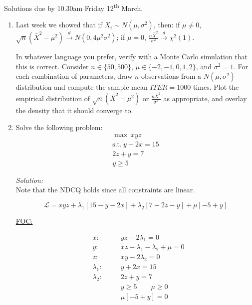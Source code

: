 \documentclass[12pt]{article}
\newif\ifsln
\begin{document}
\pagestyle{fancyplain}


\chead{\textbf{Tutorial 5 \ifsln Solutions \fi}}

\begin{center}
Solutions due by 10.30am Friday 12\textsuperscript{th} March.
\end{center}

\begin{enumerate}[1.]
\setlength\itemsep{5mm}

\item Last week we showed that if $X_{i} \sim N(\mu, \sigma^{2})$, then: if $\mu \not = 0$, $\sqrt{n}(\bar{X}^{2} - \mu^{2}) \overset{d}{\to} N(0, 4\mu^{2}\sigma^{2})$; if $\mu = 0$, $\frac{n\bar{X}^{2}}{\sigma^{2}} \overset{d}{\to} \chi^{2}(1)$. \smallskip

In whatever language you prefer, verify with a Monte Carlo simulation that this is correct. Consider $n \in \{50, 500\}$, $\mu \in \{-2, -1, 0, 1, 2\}$, and $\sigma^{2} = 1$. For each combination of parameters, draw $n$ observations from a $N(\mu, \sigma^{2})$ distribution and compute the sample mean $ITER = 1000$ times. Plot the empirical distribution of $\sqrt{n}(\bar{X}^{2} - \mu^{2})$ or $\frac{n\bar{X}^{2}}{\sigma^{2}}$ as appropriate, and overlay the density that it should converge to.

\ifsln
\textit{Solution:}\\
See end of document.
\fi


\item Solve the following problem:
\begin{gather*}
\max \ xyz \\
\text{s.t.} \ y + 2x = 15\\
2z + y = 7\\
y \geq 5 
\end{gather*}

\ifsln
\textit{Solution:}\\
Note that the NDCQ holds since all constraints are linear.

\[\mathcal{L} = xyz + \lambda_{1}[15 - y - 2x] + \lambda_{2}[7 - 2z - y] + \mu[-5 + y]\]

\underline{FOC:}

\begin{align}
&x:& \quad &      yz - 2\lambda_{1} = 0\\
&y:& \quad &      xz - \lambda_{1} - \lambda_{2} + \mu = 0\\
&z:& \quad &      xy - 2\lambda_{2} = 0\\
&\lambda_{1}:& \quad &     y + 2x = 15\\
&\lambda_{2}:& \quad &      2z + y = 7\\
& &&y \geq 5 \qquad \mu \geq 0 \\
&&& \mu[-5 + y] = 0
\end{align}


\end{enumerate}
\end{document}
